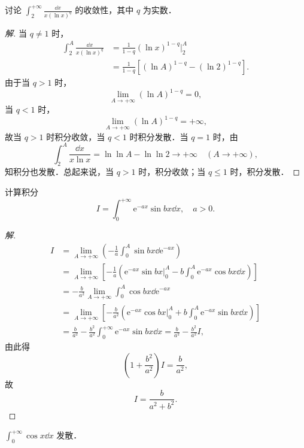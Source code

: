 \begin{example}\label{ex:11-1-3}
讨论 $\displaystyle\int_{2}^{+\infty}\frac{\dd x}{x(\ln x)^{q}}$ 的收敛性，其中 $q$ 为实数．
\end{example}

\begin{proof}[解]
当 $q\neq 1$ 时，
\[
\begin{aligned}
\int_{2}^{A}\frac{\dd x}{x(\ln x)^{q}}
&=\frac{1}{1-q}(\ln x)^{1-q}\bigg|_{2}^{A}\\
&=\frac{1}{1-q}\left[(\ln A)^{1-q}-(\ln 2)^{1-q}\right].
\end{aligned}
\]
由于当 $q>1$ 时，
\[
\lim_{A\to+\infty}(\ln A)^{1-q}=0,
\]
当 $q<1$ 时，
\[
\lim_{A\to+\infty}(\ln A)^{1-q}=+\infty,
\]
故当 $q>1$ 时积分收敛，当 $q<1$ 时积分发散．当 $q=1$ 时，由
\[
\int_{2}^{A}\frac{\dd x}{x\ln x}=\ln\ln A-\ln\ln 2\to+\infty\quad(A\to+\infty),
\]
知积分也发散．总起来说，当 $q>1$ 时，积分收敛；当 $q\leqslant 1$ 时，积分发散．
\end{proof}

\begin{example}\label{ex:11-1-4}
计算积分
\[
I=\int_{0}^{+\infty}\mathrm{e}^{-ax}\sin bx\dd x,\quad a>0.
\]
\end{example}

\begin{proof}[解]
\[
\begin{aligned}
I&=\lim_{A\to+\infty}\left(-\frac{1}{a}\int_{0}^{A}\sin bx\dd\mathrm{e}^{-ax}\right)\\
&=\lim_{A\to+\infty}\left[-\frac{1}{a}\left(\mathrm{e}^{-ax}\sin bx\Big|_{0}^{A}-b\int_{0}^{A}\mathrm{e}^{-ax}\cos bx\dd x\right)\right]\\
&=-\frac{b}{a^{2}}\lim_{A\to+\infty}\int_{0}^{A}\cos bx\dd\mathrm{e}^{-ax}\\
&=\lim_{A\to+\infty}\left[-\frac{b}{a^{2}}\left(\mathrm{e}^{-ax}\cos bx\Big|_{0}^{A}+b\int_{0}^{A}\mathrm{e}^{-ax}\sin bx\dd x\right)\right]\\
&=\frac{b}{a^{2}}-\frac{b^{2}}{a^{2}}\int_{0}^{+\infty}\mathrm{e}^{-ax}\sin bx\dd x=\frac{b}{a^{2}}-\frac{b^{2}}{a^{2}}I,
\end{aligned}
\]
由此得
\[
\left(1+\frac{b^{2}}{a^{2}}\right)I=\frac{b}{a^{2}},
\]
故
\[
I=\frac{b}{a^{2}+b^{2}}.
\]
\end{proof}

\begin{example}\label{ex:11-1-5}
$\displaystyle\int_{0}^{+\infty}\cos x\dd x$ 发散．
\end{example}

